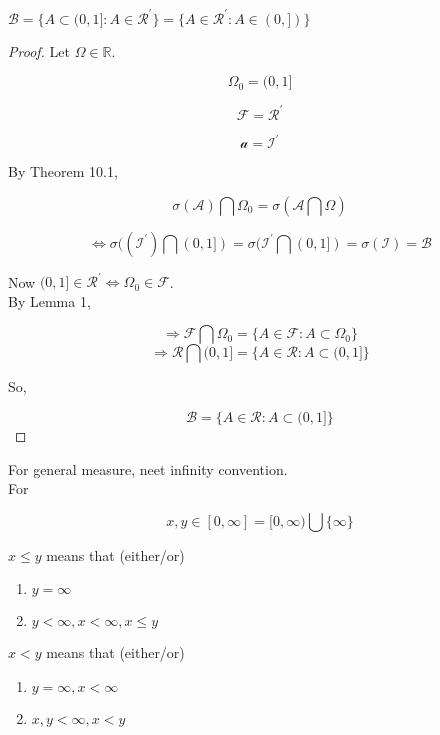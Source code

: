 \documentclass[11pt,fleqn]{book} %
\begin{document}
	\begin{corollary}
		$\mathcal{B} = \{A \subset (0, 1]: A \in \mathcal{R}^\prime \} = \{A \in \mathcal{R}^\prime: A \in (0,]) \}$ 
	\end{corollary}

	\begin{proof}
		Let $\Omega \in \mathbb{R}$. 

		$$ \Omega_0 = (0,1] $$

		$$\mathcal{F} = \mathcal{R}^\prime $$

		$$ \mathcal{a} = \mathcal{I}^\prime$$

		By Theorem 10.1, 

		$$ \sigma(\mathcal{A}) \bigcap \Omega_0 = \sigma(\mathcal{A} \bigcap \Omega)$$

		$$\Leftrightarrow \sigma((\mathcal{I}^\prime) \bigcap (0,1]) = \sigma(\mathcal{I}^\prime \bigcap (0,1]) = \sigma(\mathcal{I}) = \mathcal{B} $$

		Now $(0,1] \in \mathcal{R}^\prime \Leftrightarrow \Omega_0 \in \mathcal{F}$.\\

		By Lemma 1, 

		$$\Rightarrow \mathcal{F} \bigcap \Omega_0 = \{A \in \mathcal{F}: A \subset \Omega_0 \} $$
		$$\Rightarrow \mathcal{R} \bigcap (0,1] = \{A \in \mathcal{R}: A \subset (0,1] \} $$

		So, 

		$$\mathcal{B} = \{A \in \mathcal{R}: A \subset (0,1] \}$$
	\end{proof}


	For general measure, neet infinity convention. \\

	For

		$$x, y \in [0, \infty] = [0, \infty)\bigcup \{\infty\} $$

 		$x \leq y$ means that (either/or)

		\begin{enumerate}
			\item $y = \infty$
			\item $y< \infty, x < \infty, x \leq y$
		\end{enumerate}

		$x < y$ means that (either/or)

		\begin{enumerate}
			\item $y = \infty, x < \infty$
			\item $x, y< \infty,  x < y$
		\end{enumerate}
\end{document}
